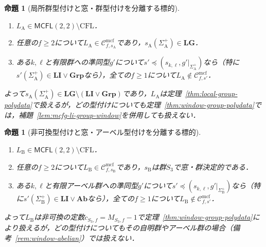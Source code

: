 \documentclass[11pt,a4paper]{ltjsarticle}
\numberwithin{equation}{section}
\theoremstyle{plain}
\newtheorem{proposition}[theorem]{命題}
\theoremstyle{definition}
\theoremstyle{remark}
\newcommand{\Cmcf}[2]{\mathcal{C}^{\mathrm{mcf}}_{#1,#2}}
\begin{document}
\begin{proposition}[局所群型付けと窓・群型付けを分離する標的]
\label{prop:lg-needed-target}
\begin{enumerate}[label=\textup{(\roman*)},leftmargin=*]
\item $L_{\mathrm A}\in\mathsf{MCFL}(2,2)\setminus\mathrm{CFL}$．
\item 任意の$f\ge2$について$L_{\mathrm A}\in\Cmcf{f}{s_{\mathrm A}}$であり，$s_{\mathrm A}(\Sigma_{\mathrm A}^+)\in\mathbf{LG}$．
\item ある$k,\ell$と有限群への準同型$g'$について$s'\preceq(s_{k,\ell},g'|_{\Sigma_{\mathrm A}^+})$なら（特に$s'(\Sigma_{\mathrm A}^+)\in\mathbf{LI}\vee\mathbf{Grp}$なら），全ての$f\ge1$について$L_{\mathrm A}\notin\Cmcf{f}{s'}$．
\end{enumerate}
よって$s_{\mathrm A}(\Sigma_{\mathrm A}^+)\in\mathbf{LG}\setminus(\mathbf{LI}\vee\mathbf{Grp})$であり，$L_{\mathrm A}$は定理~\ref{thm:local-group-polydata}で扱えるが，どの型付けについても定理~\ref{thm:window-group-polydata}では，補題~\ref{lem:mcfg-li-group-window}を併用しても扱えない．
\end{proposition}

\begin{proposition}[非可換型付けと窓・アーベル型付けを分離する標的]
\label{prop:nonabelian-needed-target}
\begin{enumerate}[label=\textup{(\roman*)},leftmargin=*]
\item $L_{\mathrm B}\in\mathsf{MCFL}(2,2)\setminus\mathrm{CFL}$．
\item 任意の$f\ge2$について$L_{\mathrm B}\in\Cmcf{f}{s_{\mathrm B}}$であり，$s_{\mathrm B}$は群$S_3$で窓・群決定的である．
\item ある$k,\ell$と有限\emph{アーベル}群への準同型$g'$について$s'\preceq(s_{k,\ell},g'|_{\Sigma_{\mathrm B}^+})$なら（特に$s'(\Sigma_{\mathrm B}^+)\in\mathbf{LI}\vee\mathbf{Ab}$なら），全ての$f\ge1$について$L_{\mathrm B}\notin\Cmcf{f}{s'}$．
\end{enumerate}
よって$L_{\mathrm B}$は非可換の定数$c_{S_3,f}=M_{S_3,f}-1$で定理~\ref{thm:window-group-polydata}により扱えるが，どの型付けについてもその自明群やアーベル群の場合（備考~\ref{rem:window-abelian}）では扱えない．
\end{proposition}
\end{document}
